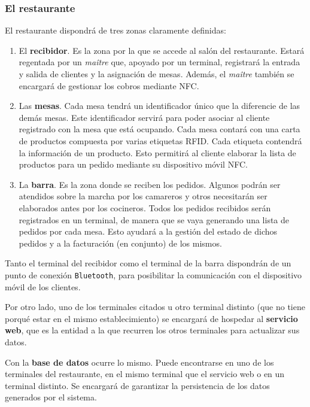     \subsubsection{El restaurante}
  El restaurante dispondrá de tres zonas claramente definidas:
  \begin{enumerate}
  \item El \textbf{recibidor}. Es la zona por la que se accede al salón del
  restaurante. Estará regentada por un \emph{maître} que, apoyado por un 
  terminal, registrará la entrada y salida de clientes y la asignación de 
  mesas. Además, el \emph{maître} también se encargará de gestionar los cobros 
  mediante \acs{NFC}.
  \item Las \textbf{mesas}. Cada mesa tendrá un identificador único que la
  diferencie de las demás mesas. Este identificador servirá para poder
  asociar al cliente registrado con la mesa que está ocupando. Cada mesa
  contará con una carta de productos compuesta por varias etiquetas
  \acs{RFID}. Cada etiqueta contendrá la información de un producto. Esto 
  permitirá al cliente elaborar la lista de productos para un pedido
  mediante su dispositivo móvil \acs{NFC}.
  \item La \textbf{barra}. Es la zona donde se reciben los pedidos. Algunos
  podrán ser atendidos sobre la marcha por los camareros y otros necesitarán
  ser elaborados antes por los cocineros. Todos los pedidos recibidos serán
  registrados en un terminal, de manera que se vaya generando una lista de
  pedidos por cada mesa. Esto ayudará a la gestión del estado de dichos 
  pedidos y a la facturación (en conjunto) de los mismos.
  \end{enumerate}

  Tanto el terminal del recibidor como el terminal de la barra dispondrán
  de un punto de conexión \texttt{Bluetooth}, para posibilitar la comunicación
  con el dispositivo móvil de los clientes.

  Por otro lado, uno de los terminales citados u otro terminal distinto (que
  no tiene porqué estar en el mismo establecimiento) se encargará de hospedar
  al \textbf{servicio web}, que es la entidad a la que recurren los otros
  terminales para actualizar sus datos.

  Con la \textbf{base de datos} ocurre lo mismo. Puede encontrarse en uno de
  los terminales del restaurante, en el mismo terminal que el servicio web o
  en un terminal distinto. Se encargará de garantizar la persistencia de los
  datos generados por el sistema.

